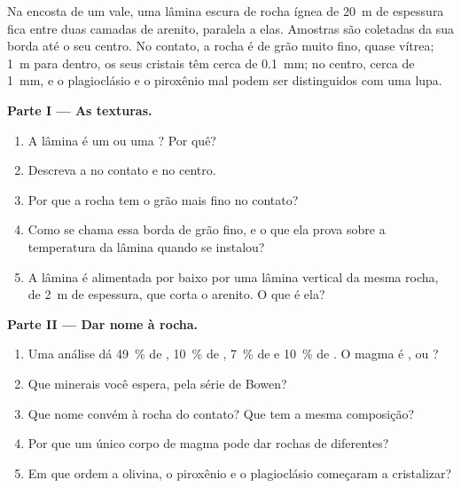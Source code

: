 \begin{problem}
\label{pb:g11:igneous-rocks:1}
Na encosta de um vale, uma lâmina escura de rocha ígnea de \qty{20}{m} de
espessura fica entre duas camadas de arenito, paralela a elas. Amostras são
coletadas da sua borda até o seu centro. No contato, a rocha é de grão muito
fino, quase vítrea; \qty{1}{m} para dentro, os seus cristais têm cerca de
\qty{0.1}{mm}; no centro, cerca de \qty{1}{mm}, e o plagioclásio e o
piroxênio mal podem ser distinguidos com uma lupa.

\medskip
\noindent\textbf{Parte I --- As texturas.}
\begin{enumerate}
  \item A lâmina é um  ou uma ? Por quê?
  \item Descreva a  no contato e no centro.
  \item Por que a rocha tem o grão mais fino no contato?
  \item Como se chama essa borda de grão fino, e o que ela prova sobre a
        temperatura da lâmina quando se instalou?
  \item A lâmina é alimentada por baixo por uma lâmina vertical da mesma
        rocha, de \qty{2}{m} de espessura, que corta o arenito. O que é ela?
\end{enumerate}

\medskip
\noindent\textbf{Parte II --- Dar nome à rocha.}
\begin{enumerate}[resume]
  \item Uma análise dá \qty{49}{\percent} de , \qty{10}{\percent}
        de , \qty{7}{\percent} de  e \qty{10}{\percent} de
        . O magma é ,  ou ?
  \item Que minerais você espera, pela série de Bowen?
  \item Que nome convém à rocha do contato? Que  tem a mesma
        composição?
  \item Por que um único corpo de magma pode dar rochas de 
        diferentes?
  \item Em que ordem a olivina, o piroxênio e o plagioclásio começaram a
        cristalizar?
\end{enumerate}


\end{problem}
